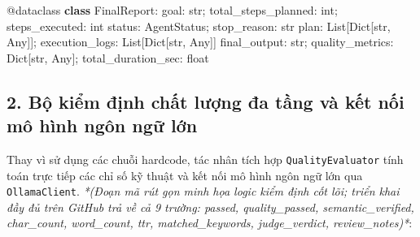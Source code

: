 \documentclass[]{article}
\newenvironment{Shaded}{}{}
\newcommand{\AttributeTok}[1]{\textcolor[rgb]{0.49,0.56,0.16}{#1}}
\newcommand{\DataTypeTok}[1]{\textcolor[rgb]{0.56,0.13,0.00}{#1}}
\newcommand{\KeywordTok}[1]{\textcolor[rgb]{0.00,0.44,0.13}{\textbf{#1}}}
\newcommand{\NormalTok}[1]{#1}
\begin{document}
\begin{Shaded}
\begin{Highlighting}[]
\AttributeTok{@dataclass}
\KeywordTok{class}\NormalTok{ }\DataTypeTok{FinalReport}\NormalTok{:}
\NormalTok{    goal: }\DataTypeTok{str}\NormalTok{; total_steps_planned: }\DataTypeTok{int}\NormalTok{; steps_executed: }\DataTypeTok{int}
\NormalTok{    status: }\DataTypeTok{AgentStatus}\NormalTok{; stop_reason: }\DataTypeTok{str}
\NormalTok{    plan: }\DataTypeTok{List}\NormalTok{[}\DataTypeTok{Dict}\NormalTok{[}\DataTypeTok{str}\NormalTok{, }\DataTypeTok{Any}\NormalTok{]]; execution_logs: }\DataTypeTok{List}\NormalTok{[}\DataTypeTok{Dict}\NormalTok{[}\DataTypeTok{str}\NormalTok{, }\DataTypeTok{Any}\NormalTok{]]}
\NormalTok{    final_output: }\DataTypeTok{str}\NormalTok{; quality_metrics: }\DataTypeTok{Dict}\NormalTok{[}\DataTypeTok{str}\NormalTok{, }\DataTypeTok{Any}\NormalTok{]; total_duration_sec: }\DataTypeTok{float}
\end{Highlighting}
\end{Shaded}

\subsection{2. Bộ kiểm định chất lượng đa tầng và kết nối mô hình ngôn ngữ lớn}
Thay vì sử dụng các chuỗi hardcode, tác nhân tích hợp \texttt{QualityEvaluator} tính toán trực tiếp các chỉ số kỹ thuật và kết nối mô hình ngôn ngữ lớn qua \texttt{OllamaClient}. \textit{*(Đoạn mã rút gọn minh họa logic kiểm định cốt lõi; triển khai đầy đủ trên GitHub trả về cả 9 trường: passed, quality\_passed, semantic\_verified, char\_count, word\_count, ttr, matched\_keywords, judge\_verdict, review\_notes)*}:
\end{document}
